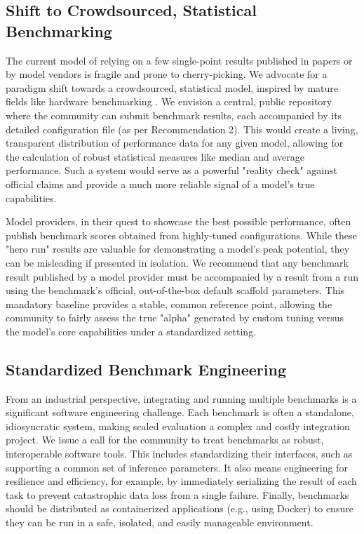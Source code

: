 \documentclass[sigconf,review]{acmart}
\begin{document}
\subsection{Shift to Crowdsourced, Statistical Benchmarking}
\label{sec:rec2}
The current model of relying on a few single-point results published in papers or by model vendors is fragile and prone to cherry-picking. We advocate for a paradigm shift towards a crowdsourced, statistical model, inspired by mature fields like hardware benchmarking \cite{spec}. We envision a central, public repository where the community can submit benchmark results, each accompanied by its detailed configuration file (as per Recommendation 2). This would create a living, transparent distribution of performance data for any given model, allowing for the calculation of robust statistical measures like median and average performance. Such a system would serve as a powerful "reality check" against official claims and provide a much more reliable signal of a model's true capabilities.

Model providers, in their quest to showcase the best possible performance, often publish benchmark scores obtained from highly-tuned configurations. While these "hero run" results are valuable for demonstrating a model's peak potential, they can be misleading if presented in isolation. We recommend that any benchmark result published by a model provider must be accompanied by a result from a run using the benchmark's official, out-of-the-box default scaffold parameters. This mandatory baseline provides a stable, common reference point, allowing the community to fairly assess the true "alpha" generated by custom tuning versus the model's core capabilities under a standardized setting.

\subsection{Standardized Benchmark Engineering}
\label{sec:rec3}
From an industrial perspective, integrating and running multiple benchmarks is a significant software engineering challenge. Each benchmark is often a standalone, idiosyncratic system, making scaled evaluation a complex and costly integration project. We issue a call for the community to treat benchmarks as robust, interoperable software tools. This includes standardizing their interfaces, such as supporting a common set of inference parameters. It also means engineering for resilience and efficiency, for example, by immediately serializing the result of each task to prevent catastrophic data loss from a single failure. Finally, benchmarks should be distributed as containerized applications (e.g., using Docker) to ensure they can be run in a safe, isolated, and easily manageable environment.
\end{document}
